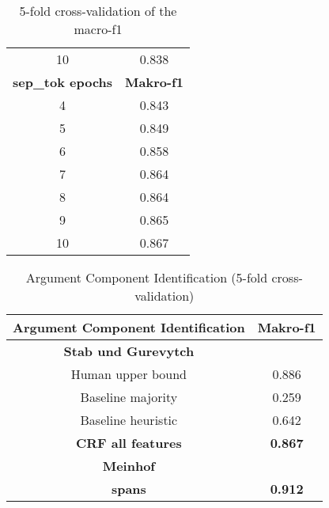 \documentclass[12]{article}
\newcommand\T{\rule{0pt}{3.6ex}}       %
\newcommand\I{\rule[-1.25ex]{0pt}{0pt}} %
\newcommand\B{\rule[-1.8ex]{0pt}{0pt}} %
\theoremstyle{mytheoremstyle}
\theoremstyle{mytheoremstyle}
\theoremstyle{myproblemstyle}
\begin{document}
\begin{table}[!h]
\begin{tabular}{c|c}
      10 & 0.838 \vspace{3ex}\\
      \textbf{sep\_tok epochs} & \textbf{Makro-f1}\\
      \hline
      \hline
      4 & 0.843\\
      5 & 0.849\\
      6 & 0.858\\
      7 & 0.864\\
      8 & 0.864\\
      9 & 0.865\\
      10 & 0.867 \vspace{25ex}\\
    \end{tabular}
    \vfill
    \caption{5-fold cross-validation of the macro-f1}
    \label{tab:my_label}
  \end{table}


  \begin{table}[!h]
    \centering
    \begin{tabular}{c|c} 
      \large\textbf{Argument Component Identification} &  \large\textbf{Makro-f1}\\ 
      \hline
      \hline
      \textbf{Stab und Gurevytch}& \T \I \\
      Human upper bound & 0.886\\
      Baseline majority & 0.259\\
      Baseline heuristic & 0.642\\
      \textbf{CRF all features} & \textbf{0.867} \B \\
      \hline
      \textbf{Meinhof} & \T \I \\
      \textbf{spans} & \textbf{0.912} \B \\ 
    \end{tabular}
    \caption{Argument Component Identification (5-fold cross-validation)}
    \label{tab:my_label}
  \end{table}
\end{document}
